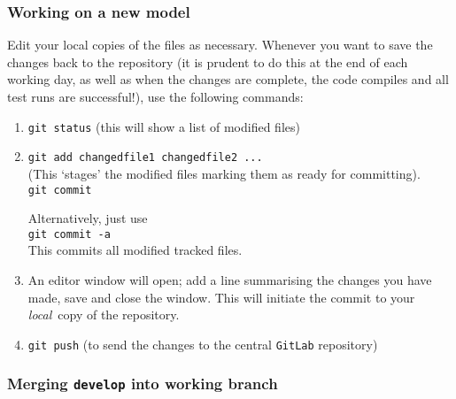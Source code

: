 \subsubsection{Working on a new model}

Edit your local copies of the files as necessary. Whenever you want to save
the changes back to the repository (it is prudent to do this at the end of
each working day, as well as when the changes are complete, the code compiles
and all test runs are successful!), use the following commands:
\begin{enumerate}

\item \texttt{git status}  (this will show a list of modified files)

\item \texttt{git add changedfile1 changedfile2 ...}  \\
  (This `stages' the modified files marking them as ready for committing).  \\
  \texttt{git commit}
  
  Alternatively, just use\\
  \texttt{git commit -a} \\
  This commits all modified tracked files.

\item An editor window will open; add a line summarising the changes you have made, save and close the window. This will initiate the commit to your \textit{local}\ copy of the repository.

\item \texttt{git push}  (to send the changes to the central \texttt{GitLab} repository)

\end{enumerate}

\subsubsection{Merging \texttt{develop} into working branch}

